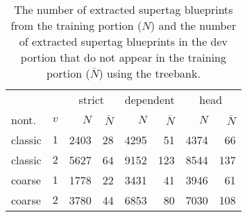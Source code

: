 \documentclass[../../document.tex]{subfiles}
\begin{document}
    \begin{table}
        \caption{\label{tbl:experiments:dptb:size}
        The number of extracted supertag blueprints from the training portion ($N$) and the number of extracted supertag blueprints in the dev portion that do not appear in the training portion ($\overline{N}$) using the \dptb{} treebank.
        }
        \centering
        \setlength{\tabcolsep}{4pt}
        \vspace{.2cm}
        \begin{tabular}{lc|rr|rr|rr}
            \toprule
             &        & \multicolumn{2}{c|}{strict} & \multicolumn{2}{c|}{dependent} & \multicolumn{2}{c}{head}  \\
 nont.   &\(v\)   & $N$ & $\overline{N}$ & $N$ & $\overline{N}$ & $N$ & $\overline{N}$ \\ \hline
  classic & \(1\)  & 2403 &  28 &  4295 &  51 &  4374 &  66  \\
  classic & \(2\)  & 5627 &  64 &  9152 & 123 &  8544 & 137  \\
  coarse  & \(1\)  & 1778 &  22 &  3431 &  41 &  3946 &  61  \\
  coarse  & \(2\)  & 3780 &  44 &  6853 &  80 &  7030 & 108  \\
    \bottomrule
        \end{tabular}
    \end{table}
\end{document}
